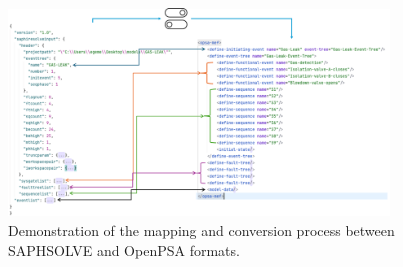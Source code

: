 \begin{figure}[H]
    \centering
    \includegraphics[width=0.9\textwidth]{3_identifying_gaps/benchmarking/datasets/figures/mef_demonstration.png}
    \caption{Demonstration of the mapping and conversion process between SAPHSOLVE and OpenPSA formats.}
    \label{fig:mef_demonstration}
\end{figure}
